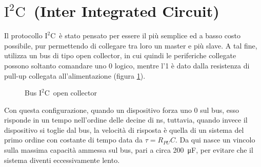 \documentclass[11pt,4paper]{report}
\newcommand{\iic}{$\text{I}^2\text{C}$}
\begin{document}
\section{\iic\ (Inter Integrated Circuit)}
Il protocollo \iic\ è stato pensato per essere il più semplice ed a basso costo possibile, pur permettendo di collegare tra loro un master e più slave. A tal fine, utilizza un bus di tipo open collector, in cui quindi le periferiche collegate possono soltanto comandare uno 0 logico, mentre l'1 è dato dalla resistenza di pull-up collegata all'alimentazione (figura \ref{fig:busiic}). 

\begin{figure}[hbtp]
	\centering
	
	\caption{Bus \iic\ open collector}
	\label{fig:busiic}
\end{figure}

Con questa configurazione, quando un dispositivo forza uno 0 sul bus, esso risponde in un tempo nell'ordine delle decine di \si{\nano\second}, tuttavia, quando invece il dispositivo si toglie dal bus, la velocità di risposta è quella di un sistema del primo ordine con costante di tempo data da $\tau = R_{PU}C$. Da qui nasce un vincolo sulla massima capacità ammessa sul bus, pari a circa \SI{200}{\micro\farad}, per evitare che il sistema diventi eccessivamente lento.
\end{document}
